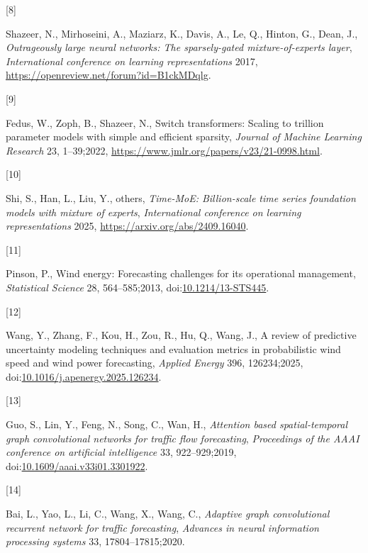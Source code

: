 \documentclass[
  11pt]{article}
\newlength{\cslhangindent}
\newlength{\csllabelwidth}
\newenvironment{CSLReferences}[2] %
 {\begin{list}{}{%
  \setlength{\itemindent}{0pt}
  \setlength{\leftmargin}{0pt}
  \setlength{\parsep}{0pt}
  \ifodd #1
   \setlength{\leftmargin}{\cslhangindent}
   \setlength{\itemindent}{-1\cslhangindent}
  \fi
  \setlength{\itemsep}{#2\baselineskip}}}
 {\end{list}}
\newcommand{\CSLLeftMargin}[1]{\parbox[t]{\csllabelwidth}{\strut#1\strut}}
\newcommand{\CSLRightInline}[1]{\parbox[t]{\linewidth - \csllabelwidth}{\strut#1\strut}}
\begin{document}
\begin{CSLReferences}{0}{0}
\CSLLeftMargin{{[}8{]} }%
\CSLRightInline{Shazeer, N., Mirhoseini, A., Maziarz, K., Davis, A., Le,
Q., Hinton, G., Dean, J., \emph{Outrageously large neural networks: The
sparsely-gated mixture-of-experts layer}, \emph{International conference
on learning representations} 2017,
\url{https://openreview.net/forum?id=B1ckMDqlg}.}

\CSLLeftMargin{{[}9{]} }%
\CSLRightInline{Fedus, W., Zoph, B., Shazeer, N., Switch transformers:
Scaling to trillion parameter models with simple and efficient sparsity,
\emph{Journal of Machine Learning Research} 23, 1--39;2022,
\url{https://www.jmlr.org/papers/v23/21-0998.html}.}

\CSLLeftMargin{{[}10{]} }%
\CSLRightInline{{Shi, S., Han, L., Liu, Y., others}, \emph{Time-MoE:
Billion-scale time series foundation models with mixture of experts},
\emph{International conference on learning representations} 2025,
\url{https://arxiv.org/abs/2409.16040}.}

\CSLLeftMargin{{[}11{]} }%
\CSLRightInline{Pinson, P., Wind energy: Forecasting challenges for its
operational management, \emph{Statistical Science} 28, 564--585;2013,
doi:\href{https://doi.org/10.1214/13-STS445}{10.1214/13-STS445}.}

\CSLLeftMargin{{[}12{]} }%
\CSLRightInline{Wang, Y., Zhang, F., Kou, H., Zou, R., Hu, Q., Wang, J.,
A review of predictive uncertainty modeling techniques and evaluation
metrics in probabilistic wind speed and wind power forecasting,
\emph{Applied Energy} 396, 126234;2025,
doi:\href{https://doi.org/10.1016/j.apenergy.2025.126234}{10.1016/j.apenergy.2025.126234}.}

\CSLLeftMargin{{[}13{]} }%
\CSLRightInline{Guo, S., Lin, Y., Feng, N., Song, C., Wan, H.,
\emph{Attention based spatial-temporal graph convolutional networks for
traffic flow forecasting}, \emph{Proceedings of the AAAI conference on
artificial intelligence} 33, 922--929;2019,
doi:\href{https://doi.org/10.1609/aaai.v33i01.3301922}{10.1609/aaai.v33i01.3301922}.}

\CSLLeftMargin{{[}14{]} }%
\CSLRightInline{Bai, L., Yao, L., Li, C., Wang, X., Wang, C.,
\emph{Adaptive graph convolutional recurrent network for traffic
forecasting}, \emph{Advances in neural information processing systems}
33, 17804--17815;2020.}


\end{CSLReferences}
\end{document}
